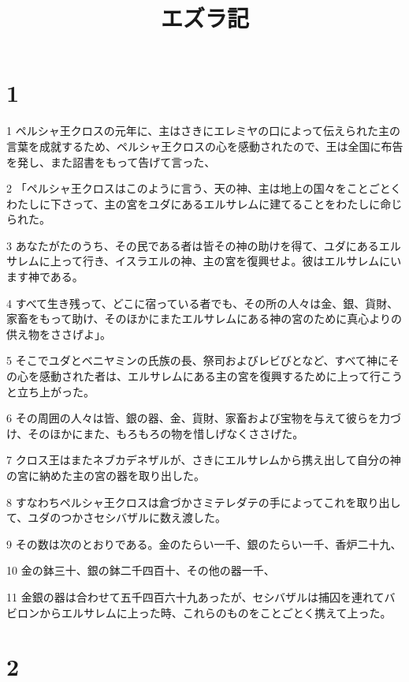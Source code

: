 

\title{エズラ記}


\chapter{1}

\par 1 ペルシャ王クロスの元年に、主はさきにエレミヤの口によって伝えられた主の言葉を成就するため、ペルシャ王クロスの心を感動されたので、王は全国に布告を発し、また詔書をもって告げて言った、
\par 2 「ペルシャ王クロスはこのように言う、天の神、主は地上の国々をことごとくわたしに下さって、主の宮をユダにあるエルサレムに建てることをわたしに命じられた。
\par 3 あなたがたのうち、その民である者は皆その神の助けを得て、ユダにあるエルサレムに上って行き、イスラエルの神、主の宮を復興せよ。彼はエルサレムにいます神である。
\par 4 すべて生き残って、どこに宿っている者でも、その所の人々は金、銀、貨財、家畜をもって助け、そのほかにまたエルサレムにある神の宮のために真心よりの供え物をささげよ」。
\par 5 そこでユダとベニヤミンの氏族の長、祭司およびレビびとなど、すべて神にその心を感動された者は、エルサレムにある主の宮を復興するために上って行こうと立ち上がった。
\par 6 その周囲の人々は皆、銀の器、金、貨財、家畜および宝物を与えて彼らを力づけ、そのほかにまた、もろもろの物を惜しげなくささげた。
\par 7 クロス王はまたネブカデネザルが、さきにエルサレムから携え出して自分の神の宮に納めた主の宮の器を取り出した。
\par 8 すなわちペルシャ王クロスは倉づかさミテレダテの手によってこれを取り出して、ユダのつかさセシバザルに数え渡した。
\par 9 その数は次のとおりである。金のたらい一千、銀のたらい一千、香炉二十九、
\par 10 金の鉢三十、銀の鉢二千四百十、その他の器一千、
\par 11 金銀の器は合わせて五千四百六十九あったが、セシバザルは捕囚を連れてバビロンからエルサレムに上った時、これらのものをことごとく携えて上った。

\chapter{2}

